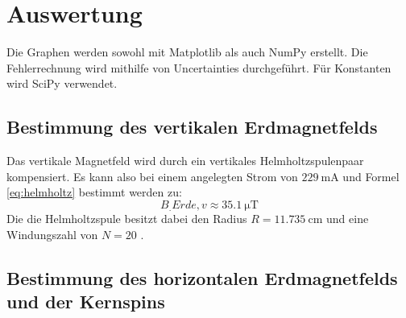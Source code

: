\section{Auswertung}
\label{sec:Auswertung}

Die Graphen werden sowohl mit Matplotlib \cite{matplotlib} als auch NumPy \cite{numpy} erstellt. Die Fehlerrechnung wird mithilfe von Uncertainties \cite{uncertainties} durchgeführt. Für Konstanten wird SciPy \cite{scipy} verwendet.

\subsection{Bestimmung des vertikalen Erdmagnetfelds}

Das vertikale Magnetfeld wird durch ein vertikales Helmholtzspulenpaar kompensiert. Es kann also bei einem angelegten Strom von $\SI{229}{\milli\ampere}$ und Formel \eqref{eq:helmholtz} bestimmt werden zu:
\[
B_.{Erde,v} \approx \SI{35.1}{\micro\tesla}
\]
Die die Helmholtzspule besitzt dabei den Radius $R=\SI{11,735}{\centi\metre}$ und eine Windungszahl von $N=20$ \cite{V21}.

\subsection{Bestimmung des horizontalen Erdmagnetfelds und der Kernspins}

